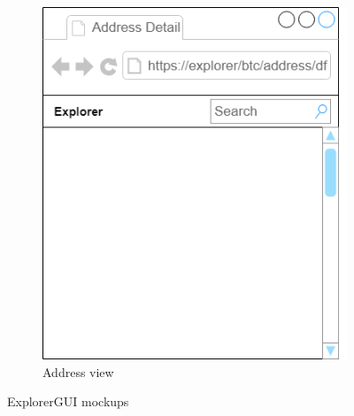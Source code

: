 \begin{figure}[h]
\begin{subfigure}[b]{.4\textwidth}
        \includegraphics[width=1.0\linewidth]{mockups/address.png}
        \caption{Address view }
        \label{addressMockup}
    \end{subfigure}
    \caption{ExplorerGUI mockups}
\end{figure}

